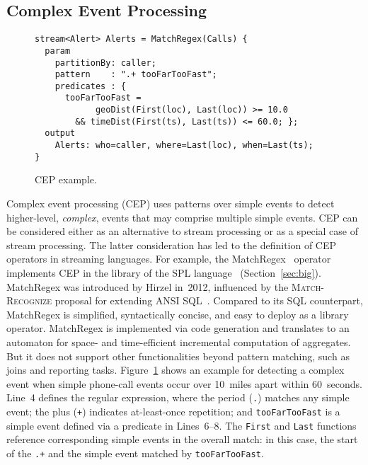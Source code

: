 \subsection{Complex Event Processing}\label{sec:cep} %


\begin{figure}[!h]
\begin{lstlisting}
stream<Alert> Alerts = MatchRegex(Calls) {
  param
    partitionBy: caller;
    pattern    : ".+ tooFarTooFast";
    predicates : {
      tooFarTooFast =
            geoDist(First(loc), Last(loc)) >= 10.0
        && timeDist(First(ts), Last(ts)) <= 60.0; };
  output
    Alerts: who=caller, where=Last(loc), when=Last(ts);
}
\end{lstlisting}
\vspace*{-4mm}
\caption{\label{fig:cep}CEP example.}
\end{figure}


Complex event processing (CEP) uses patterns over simple events to
detect higher-level, \emph{complex}, events that may comprise multiple
simple events.  CEP can be considered either as an alternative to
stream processing or as a special case of stream processing. The
latter consideration has led to the definition of CEP operators in
streaming languages. For example, the MatchRegex~\cite{hirzel_2012}
operator implements CEP in the library of the SPL
language~\cite{hirzel_schneider_gedik_2017} (Section~\ref{sec:big}). MatchRegex was introduced by Hirzel in~2012,
influenced by the \textsc{Match-Recognize} proposal for extending ANSI
SQL~\cite{zemke_et_al_2007}.  Compared to its SQL counterpart,
MatchRegex is simplified, syntactically concise, and easy to deploy as
a library operator. MatchRegex is implemented via code generation and
translates to an automaton for space- and time-efficient incremental
computation of aggregates. But it does not support other
functionalities beyond pattern matching, such as joins and reporting
tasks. Figure~\ref{fig:cep} shows an example for detecting a complex
event when simple phone-call events occur over 10~miles apart within
60~seconds. Line~4 defines the regular expression, where the period
(\lstinline{.}) matches any simple event; the plus (\lstinline{+})
indicates at-least-once repetition; and \lstinline{tooFarTooFast} is a
simple event defined via a predicate in \mbox{Lines 6--8}. The
\lstinline{First} and \lstinline{Last} functions reference
corresponding simple events in the overall match: in this case, the
start of the \lstinline{.+} and the simple event matched by
\lstinline{tooFarTooFast}.

